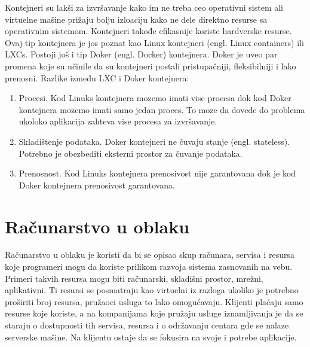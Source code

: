 \documentclass[12pt,oneside]{memoir}
\begin{document}
Kontejneri su lakši za izvršavanje kako im ne treba ceo operativni sistem ali virtuelne mašine prižaju bolju izloaciju kako ne dele direktno resurse sa operativnim sistemom. Kontejneri takođe efikasnije koriste hardverske resurse. Ovaj tip kontejnera je jos poznat kao Linux kontejneri (engl. Linux containers) ili LXCs. Postoji još i tip Doker (engl. Docker) kontejnera. Doker je uveo par promena koje su učinile da su kontejneri postali pristupačniji, fleksibilniji i lako prenosni\cite{gswc}. Razlike između LXC i Doker kontejnera:
\begin{enumerate}
  \item Procesi. Kod Linuks kontejnera mozemo imati vise procesa dok kod Doker kontejnera mozemo imati samo jedan proces. To moze da dovede do problema ukoloko aplikacija zahteva vise procesa za izvršavanje.
  \item Skladištenje podataka. Doker kontejneri ne čuvaju stanje (engl. stateless). Potrebno je obezbediti eksterni prostor za čuvanje podataka.
  \item Prenosnost. Kod Linuks kontejnera prenosivost nije garantovana dok je kod Doker kontejnera prenosivost garantovana.
\end{enumerate}

\section{Računarstvo u oblaku}

Računarstvo u oblaku je koristi da bi se opisao skup računara, servisa i resursa koje programeri mogu da koriste prilikom razvoja sistema zasnovanih na vebu. Primeri takvih resursa mogu biti računarski, skladišni prostor, mrežni, aplikativni. Ti resursi se posmatraju kao virtuelni iz razloga ukoliko je potrebno proširiti broj resursa, pružaoci usluga to lako omogućavaju. Klijenti plaćaju samo resurse koje koriste, a na kompanijama koje pružaju usluge iznamljivanja je da se staraju o dostupnosti tih servisa, resursa i o održavanju centara gde se nalaze serverske mašine. Na klijentu ostaje da se fokusira na svoje i potrebe aplikacije\cite{cc}.
\end{document}
